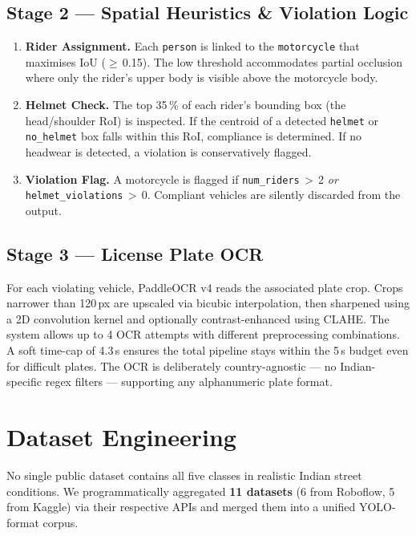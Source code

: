 \documentclass[10pt,a4paper,twocolumn]{article}
\begin{document}
\subsection{Stage 2 — Spatial Heuristics \& Violation Logic}
\begin{enumerate}
  \item \textbf{Rider Assignment.} Each \texttt{person} is linked to the \texttt{motorcycle} that maximises IoU ($\geq$\,0.15). The low threshold accommodates partial occlusion where only the rider's upper body is visible above the motorcycle body.
  \item \textbf{Helmet Check.} The top 35\,\% of each rider's bounding box (the head/shoulder RoI) is inspected. If the centroid of a detected \texttt{helmet} or \texttt{no\_helmet} box falls within this RoI, compliance is determined. If no headwear is detected, a violation is conservatively flagged.
  \item \textbf{Violation Flag.} A motorcycle is flagged if \texttt{num\_riders}$\,>$\,2 \emph{or} \texttt{helmet\_violations}$\,>$\,0. Compliant vehicles are silently discarded from the output.
\end{enumerate}

\subsection{Stage 3 — License Plate OCR}
For each violating vehicle, PaddleOCR v4 reads the associated plate crop. Crops narrower than 120\,px are upscaled via bicubic interpolation, then sharpened using a 2D convolution kernel and optionally contrast-enhanced using CLAHE. The system allows up to 4 OCR attempts with different preprocessing combinations. A soft time-cap of 4.3\,s ensures the total pipeline stays within the 5\,s budget even for difficult plates. The OCR is deliberately country-agnostic — no Indian-specific regex filters — supporting any alphanumeric plate format.

\section{Dataset Engineering}
No single public dataset contains all five classes in realistic Indian street conditions. We programmatically aggregated \textbf{11 datasets} (6 from Roboflow, 5 from Kaggle) via their respective APIs and merged them into a unified YOLO-format corpus.
\end{document}
